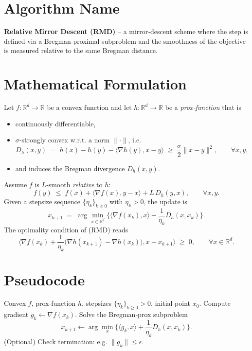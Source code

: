 \documentclass{article}
\newcommand{\inner}[2]{\langle #1,#2\rangle}
\newcommand{\grad}{\nabla}
\newcommand{\Breg}[2]{D_{h}(#1,#2)}
\begin{document}
\section*{Algorithm Name}
\textbf{Relative Mirror Descent (RMD)} – a mirror‑descent scheme where the step is defined via a Bregman‑proximal subproblem and the smoothness of the objective is measured relative to the same Bregman distance.

\section*{Mathematical Formulation}
Let $f:\mathbb{R}^{d}\rightarrow\mathbb{R}$ be a convex function and let $h:\mathbb{R}^{d}\rightarrow\mathbb{R}$ be a \emph{prox‑function} that is
\begin{itemize}
    \item continuously differentiable,
    \item $\sigma$‑strongly convex w.r.t. a norm $\|\cdot\|$, i.e. 
    \[
        \Breg{x}{y}\;=\;h(x)-h(y)-\inner{\grad h(y)}{x-y}\;\ge\;\frac{\sigma}{2}\|x-y\|^{2},\qquad\forall x,y,
    \]
    \item and induces the Bregman divergence $\Breg{x}{y}$.
\end{itemize}
Assume $f$ is $L$‑smooth \emph{relative} to $h$:
\begin{equation}
    f(y)\;\le\;f(x)+\inner{\grad f(x)}{y-x}+L\,\Breg{y}{x},
    \qquad\forall x,y. \tag{R‑smooth}
\end{equation}
Given a stepsize sequence $\{\eta_{k}\}_{k\ge0}$ with $\eta_{k}>0$, the update is
\begin{equation}
    x_{k+1}\;=\;\arg\min_{x\in\mathbb{R}^{d}}
    \Big\{\inner{\grad f(x_{k})}{x}+\frac{1}{\eta_{k}}\Breg{x}{x_{k}}\Big\}. \tag{RMD}
\end{equation}
The optimality condition of (RMD) reads
\begin{equation}
    \inner{\grad f(x_{k})+\frac{1}{\eta_{k}}\big(\grad h(x_{k+1})-\grad h(x_{k})\big)}{x-x_{k+1}}\;\ge\;0,
    \qquad\forall x\in\mathbb{R}^{d}. \tag{OC}
\end{equation}

\section*{Pseudocode}
\begin{algorithm}[H]
\caption{Relative Mirror Descent}
\begin{algorithmic}[1]
\Require Convex $f$, prox‑function $h$, stepsizes $\{\eta_k\}_{k\ge0}>0$, initial point $x_0$.
    \State Compute gradient $g_k\gets \grad f(x_k)$.
    \State Solve the Bregman‑prox subproblem
    \[
        x_{k+1}\gets\arg\min_{x}\Big\{\inner{g_k}{x}+\frac{1}{\eta_k}\Breg{x}{x_k}\Big\}.
    \]
    \State (Optional) Check termination: e.g. $\|g_k\|\le\epsilon$.
\EndFor
\end{algorithmic}
\end{algorithm}
\end{document}
